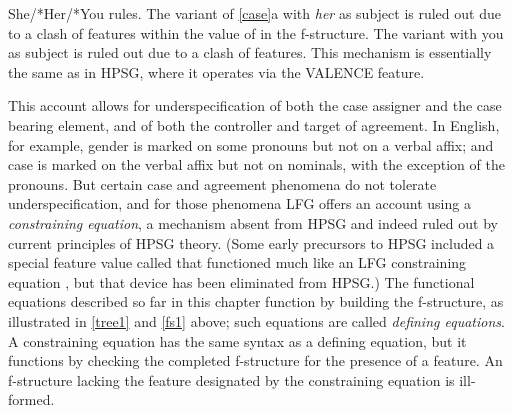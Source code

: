 \eal 
 \label{case}
\ex She/*Her/*You rules.
 \zl
The variant of \ref{case}a with \textit{her} as subject is ruled out due to a clash of  features within the value of \subj{} in the f-structure.  The variant with you as subject is ruled out due to a clash of  features.  This mechanism is essentially the same as in HPSG, where it operates via the VALENCE feature.  

This account allows for underspecification of both the case assigner and the case bearing element, and of both the controller and target of agreement.   In  English, for example, gender is marked on some pronouns but not on a verbal affix; and case is marked on the verbal affix but not on  nominals, with the exception of the pronouns.  But certain case and agreement phenomena do not tolerate underspecification, and for those phenomena LFG offers an account using a \textit{constraining equation}, a mechanism absent from HPSG and indeed ruled out by current principles of HPSG theory.  (Some early precursors to HPSG included a special feature value called  that functioned much like an LFG constraining equation \citep[pp. 36-7]{Shieber86a}, but that device has been eliminated from HPSG.)  The functional equations described so far in this chapter function by building the f-structure, as illustrated in \ref{tree1} and \ref{fs1} above; such equations are called \textit{defining equations}.  A constraining equation has the same syntax as a defining equation, but it functions by checking the completed f-structure for the presence of a feature.  An f-structure lacking the feature designated by the constraining equation is ill-formed.  

